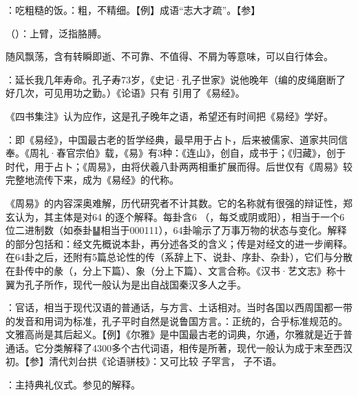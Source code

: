 {
\item {}：吃粗糙的饭。：粗，不精细。【例】成语“志大才疏”。【参】
\item {}（）：上臂，泛指胳膊。
\item {}随风飘荡，含有转瞬即逝、不可靠、不值得、不屑为等意味，可以自行体会。
}
{}


{
\item {}：延长我几年寿命。孔子寿73岁，《史记·孔子世家》说他晚年（编的皮绳磨断了好几次，可见用功之勤。）《论语》只有  引用了《易经》。

《四书集注》认为应作，这是孔子晚年之语，希望还有时间把《易经》学好。

\item {}：即《易经》，中国最古老的哲学经典，最早用于占卜，后来被儒家、道家共同信奉。《周礼·春官宗伯》载，《易》有3种：《连山》，创自，成书于；《归藏》，创于时代，用于占卜；《周易》，由将伏羲八卦两两相重扩展而得。后世仅有《周易》较完整地流传下来，成为《易经》的代称。

《周易》的内容深奥难解，历代研究者不计其数。它的名称就有很强的辩证性，郑玄认为，其主体是对64 的逐个解释。每卦含6 （，每爻或阴或阳），相当于一个6位二进制数（如泰卦{䷊}相当于000111），64卦喻示了万事万物的状态与变化。解释的部分包括和：经文先概说本卦，再分述各爻的含义；传是对经文的进一步阐释。在64卦之后，还附有5篇总论性的传（系辞上下、说卦、序卦、杂卦），它们与分散在卦传中的彖（，分上下篇）、象（分上下篇）、文言合称。《汉书·艺文志》称十翼为孔子所作，现代一般认为是出自战国秦汉多人之手。
}
{}


{
\item {}：官话，相当于现代汉语的普通话，与方言、土话相对。当时各国以西周国都一带的发音和用词为标准，孔子平时自然是说鲁国方言。：正统的，合乎标准规范的。文雅高尚是其后起义。【例】《尔雅》是中国最古老的词典，尔通，尔雅就是近于普通话。它分类解释了4300多个古代词语，相传是所著，现代一般认为成于末至西汉初。【参】清代刘台拱《论语骈枝》：又可比较  子罕言， 子不语。
\item {}：主持典礼仪式。参见的解释。
}
{}


